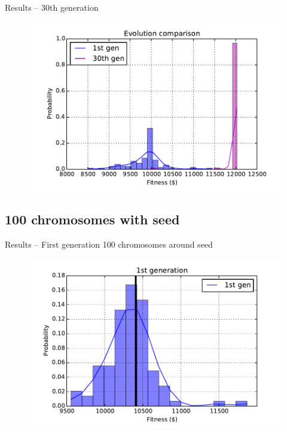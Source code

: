 \documentclass[12pt,portuguese]{beamer}
\begin{document}
\begin{frame}{Results -- 30th generation}
	\begin{figure}[h]
	\centering
	\includegraphics[width=0.9\columnwidth]{images/30r_100.pdf}
	\end{figure}
\end{frame}


\subsection{100 chromosomes with seed}
\begin{frame}{Results -- First generation 100 chromosomes around seed}
	\begin{figure}[h]
	\centering
	\includegraphics[width=0.9\columnwidth]{images/01l_100.pdf}
	\end{figure}
\end{frame}
\end{document}
